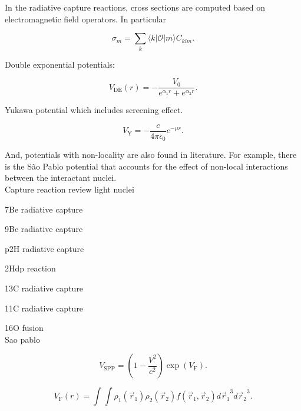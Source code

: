 \documentclass[openany]{book}
\begin{document}
In the radiative capture reactions, cross sections are computed based on electromagnetic field operators. In particular 

\begin{equation}
	\sigma_m = \sum_{k}{\langle k | \mathcal{O} | m \rangle} C_{klm}.		
\end{equation}


Double exponential potentials: 

\begin{equation}
	V_{\mathrm{DE}}(r) = - \frac{V_0}{e^{\alpha_1 r} + e^{\alpha_2 r}}.
\end{equation}

Yukawa potential  which includes screening effect.

\begin{equation}
	V_{\mathrm{Y}} = -\frac{c}{4\pi\epsilon_0}e^{-\mu r}.
\end{equation}

And, potentials with non-locality are also found in literature. For example, there is the São Pablo potential that accounts for the effect of non-local interactions between the interactant nuclei. \\

Capture reaction review light nuclei\cite{ghasemi_sadeghi_2018}
\cite{dubovichenko_dzhazairov-kakhramanov_2012}

7Be radiative capture \cite{tursunov_turakulov_kadyrov_blokhintsev_2021}
\cite{bertulani_1996}

9Be radiative capture \cite{kabir_nabi_2021}

p2H radiative capture \cite{dubovichenko_dzhazairov-kakhramanov_2009}

2Hdp reaction \cite{czerski_huke_heide_ruprecht_2006}

13C radiative capture \cite{kabir_irgaziev_nabi_2020}
\cite{dubovichenko_2012}

11C radiative capture\cite{kabir_irgaziev_nabi_sagheer_2022}

16O fusion \cite{diaz-torres_gasques_wiescher_2007} \\

Sao pablo \cite{chamon_2007}


\begin{equation}
	V_{\mathrm{SPP}} = \left(1 - \frac{V^2}{c^2}\right) \exp{\left(V_{\mathrm{F}}\right)}.
\end{equation}

\begin{equation}
	V_{\mathrm{F}}(r) = \int \int \rho_1(\vec r_1)  \rho_2(\vec r_2) f(\vec r_1, \vec r_2) {d\vec{r}_1}^3  {d\vec{r}_2}^3.
\end{equation}
\end{document}
